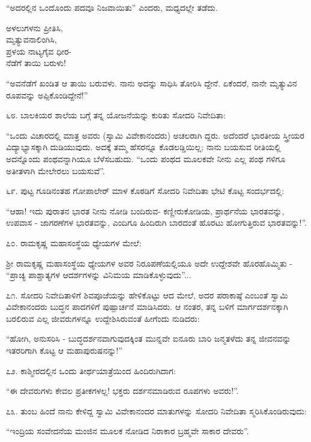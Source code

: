 “ಅದರಲ್ಲಿನ ಒಂದೊಂದು ಪದವೂ ನಿಜವಾಯಿತು” ಎಂದರು, ಮಧ್ಯದಲ್ಲೇ ತಡೆದು.

\begin{myquote}
ಅಳಲುಗಳನು ಪ್ರೀತಿಸಿ,\\ಮೃತ್ಯುವನಾಲಿಂಗಿಸಿ,\\ಪ್ರಳಯ ನಾಟ್ಯಗೈವ ಧೀರ-\\ನೆಡೆಗೆ ತಾಯಿ ಬರುಳು!
\end{myquote}

“ಅವನೆಡೆಗೆ ಖಂಡಿತ ಆ ತಾಯಿ ಬರುವಳು. ನಾನು ಅದನ್ನು ಸಾಧಿಸಿ ತೋರಿಸಿ ದ್ದೇನೆ. ಏಕೆಂದರೆ, ನಾನೇ ಮೃತ್ಯುವಿನ ರೂಪವನ್ನು ಅಪ್ಪಿಕೊಂಡಿದ್ದೇನೆ!” 

೬೮. ಬಾಲಕಿಯರ ಶಾಲೆಯ ಬಗ್ಗೆ ತನ್ನ ಯೋಜನೆಯನ್ನು ಕುರಿತು ಸೋದರಿ ನಿವೇದಿತಾ:

“ಒಂದು ವಿಚಾರದಲ್ಲಿ ಮಾತ್ರ ಅವರು (ಸ್ವಾಮಿ ವಿವೇಕಾನಂದರು) ಅಚಲರಾಗಿ ದ್ದರು. ಅದೆಂದರೆ ಭಾರತೀಯ ಸ್ತ್ರೀಯರ ವಿದ್ಯಾಭ್ಯಾಸಕ್ಕಾಗಿ ದುಡಿಯುವುದು. ಅದಕ್ಕೆ ತಮ್ಮ ಹೆಸರನ್ನೂ ಕೊಡಲಡ್ಡಿಯಿಲ್ಲ; ನಾನು ಬಯಸುವ ರೀತಿಯಲ್ಲಿ ಅದನ್ನೊಂದು ಪಂಥವನ್ನಾಗಿಯೂ ಬೆಳೆಸಬಹುದು. “ಒಂದು ಪಂಥದ ಮೂಲಕವೇ ನೀನು ಎಲ್ಲ ಪಂಥ ಗಳಿಗೂ ಅತೀತಳಾಗಿ ಮೇಲೇರಲು ಬಯಸುವೆ”. 

೬೯. ಪುಟ್ಟ ಗೂಡಿನಂತಹ ಗೋಪಾಲೇರ್ ಮಾಳ ಕೊಠಡಿಗೆ ಸೋದರಿ ನಿವೇದಿತಾ ಭೇಟಿ ಕೊಟ್ಟ ಸಂದರ್ಭದಲ್ಲಿ:

“ಆಹಾ! ಇದು ಪುರಾತನ ಭಾರತ ನೀನು ನೋಡಿ ಬಂದಿರುವ- ಕಣ್ಣೀರುಕೋಡಿಯ, ಪ್ರಾರ್ಥನೆಯ ಭಾರತವನ್ನು, ಉಪವಾಸ - ಜಾಗರಣೆಗಳ ಭಾರತವನ್ನು, ಎಂದಿಗೂ ಹಿಂದಿರುಗಿ ಬಾರದಂತೆ ಹೊರಟು ಹೋಗುತ್ತಿರುವ ಭಾರತವನ್ನು!”. 

೭೦. ರಾಮಕೃಷ್ಣ ಮಹಾಸಂಸ್ಥೆಯ ಧ್ಯೇಯಗಳ ಮೇಲೆ:

ಶ‍್ರೀ ರಾಮಕೃಷ್ಣ ಮಹಾಸಂಸ್ಥೆಯ ಧ್ಯೇಯಗಳ ಅವರ ನಿರೂಪಣೆಯಲ್ಲಿಯೂ ಅದೇ ಉದ್ದೇಶವೇ ಹೊರಹೊಮ್ಮಿತು - “ಪ್ರಾಚ್ಯ ಪಾಶ್ಚಾತ್ಯಗಳ ಆದರ್ಶಗಳನ್ನು ವಿನಿಮಯ ಮಾಡಿಕೊಳ್ಳುವುದು”... 

೭೧. ಸೋದರಿ ನಿವೇದಿತಾಳಿಗೆ ಶಿವಪೂಜೆಯನ್ನು ಹೇಳಿಕೊಟ್ಟು ಆದ ಮೇಲೆ, ಅದರ ಪರಾಕಾಷ್ಠೆ ಎಂಬಂತೆ ಸ್ವಾಮಿ ವಿವೇಕಾನಂದರು ಬುದ್ಧನ ಪಾದಗಳಿಗೆ ಪುಷ್ಪಾರ್ಚನೆ ಮಾಡಿಸಿದರು. ಆ ನಂತರ, ತನ್ನ ಬಳಿಗೆ ಮಾರ್ಗದರ್ಶನಕ್ಕಾಗಿ ಬರಲಿರುವ ಎಲ್ಲ ಜೀವರುಗಳನ್ನೂ ಉದ್ದೇಶಿಸಿರುವಂತೆ ಹೀಗೆಂದು ನುಡಿದರು:

“ಹೋಗಿ, ಅನುಸರಿಸಿ - ಬುದ್ಧದರ್ಶನವಾಗುವುದಕ್ಕಿಂತ ಮುನ್ನವೇ ಐನೂರು ಬಾರಿ ಜನ್ಮತಳೆದು ತನ್ನ ಜೀವನವನ್ನು ಇತರರಿಗಾಗಿ ಕೊಟ್ಟ ಆ ಮಹಾಪುರುಷನನ್ನು!” 

೭೨. ಕಾಶ್ಮೀರದಲ್ಲಿನ ಒಂದು ತೀರ್ಥಯಾತ್ರೆಯಿಂದ ಹಿಂದಿರುಗಿದಾಗ:

“ಈ ದೇವರುಗಳು ಕೇವಲ ಪ್ರತೀಕಗಳಲ್ಲ! ಭಕ್ತರು ದರ್ಶನಮಾಡಿರುವ ರೂಪಗಳು ಅವರು!”. 

೭೩. ತುಂಬ ಹಿಂದೆ ನಾನು ಕೇಳಿದ್ದ ಸ್ವಾಮಿ ವಿವೇಕಾನಂದರ ಮಾತುಗಳನ್ನು ಸೋದರಿ ನಿವೇದಿತಾ ಸ್ಮರಿಸಿಕೊಂಡಿರುವುದು:

“ಇಂದ್ರಿಯ ಸಂವೇದನೆಯ ಮಂಜಿನ ಮೂಲಕ ನೋಡಿದ ನಿರಾಕಾರ ಬ್ರಹ್ಮವೇ ಸಾಕಾರ ದೇವರು”. 

